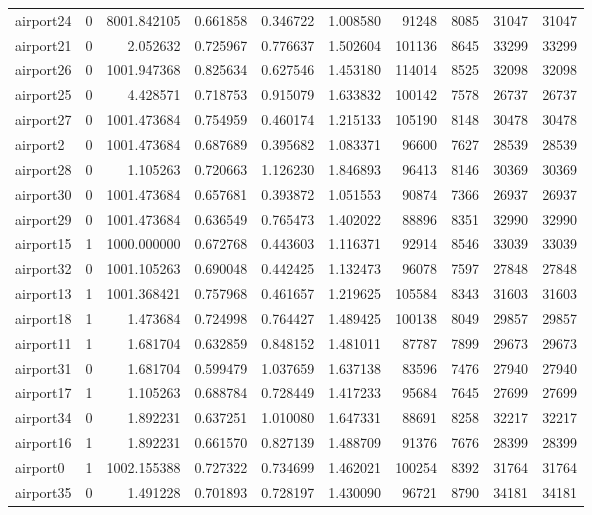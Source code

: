 \begin{longtable}{|l|r|r|r|r|r|r|r|r|r|}
airport24 & 0 & 8001.842105 & 0.661858 & 0.346722 & 1.008580 & 91248 & 8085 & 31047 & 31047 \\
airport21 & 0 & 2.052632 & 0.725967 & 0.776637 & 1.502604 & 101136 & 8645 & 33299 & 33299 \\
airport26 & 0 & 1001.947368 & 0.825634 & 0.627546 & 1.453180 & 114014 & 8525 & 32098 & 32098 \\
airport25 & 0 & 4.428571 & 0.718753 & 0.915079 & 1.633832 & 100142 & 7578 & 26737 & 26737 \\
airport27 & 0 & 1001.473684 & 0.754959 & 0.460174 & 1.215133 & 105190 & 8148 & 30478 & 30478 \\
airport2 & 0 & 1001.473684 & 0.687689 & 0.395682 & 1.083371 & 96600 & 7627 & 28539 & 28539 \\
airport28 & 0 & 1.105263 & 0.720663 & 1.126230 & 1.846893 & 96413 & 8146 & 30369 & 30369 \\
airport30 & 0 & 1001.473684 & 0.657681 & 0.393872 & 1.051553 & 90874 & 7366 & 26937 & 26937 \\
airport29 & 0 & 1001.473684 & 0.636549 & 0.765473 & 1.402022 & 88896 & 8351 & 32990 & 32990 \\
airport15 & 1 & 1000.000000 & 0.672768 & 0.443603 & 1.116371 & 92914 & 8546 & 33039 & 33039 \\
airport32 & 0 & 1001.105263 & 0.690048 & 0.442425 & 1.132473 & 96078 & 7597 & 27848 & 27848 \\
airport13 & 1 & 1001.368421 & 0.757968 & 0.461657 & 1.219625 & 105584 & 8343 & 31603 & 31603 \\
airport18 & 1 & 1.473684 & 0.724998 & 0.764427 & 1.489425 & 100138 & 8049 & 29857 & 29857 \\
airport11 & 1 & 1.681704 & 0.632859 & 0.848152 & 1.481011 & 87787 & 7899 & 29673 & 29673 \\
airport31 & 0 & 1.681704 & 0.599479 & 1.037659 & 1.637138 & 83596 & 7476 & 27940 & 27940 \\
airport17 & 1 & 1.105263 & 0.688784 & 0.728449 & 1.417233 & 95684 & 7645 & 27699 & 27699 \\
airport34 & 0 & 1.892231 & 0.637251 & 1.010080 & 1.647331 & 88691 & 8258 & 32217 & 32217 \\
airport16 & 1 & 1.892231 & 0.661570 & 0.827139 & 1.488709 & 91376 & 7676 & 28399 & 28399 \\
airport0 & 1 & 1002.155388 & 0.727322 & 0.734699 & 1.462021 & 100254 & 8392 & 31764 & 31764 \\
airport35 & 0 & 1.491228 & 0.701893 & 0.728197 & 1.430090 & 96721 & 8790 & 34181 & 34181 \\

\end{longtable}

